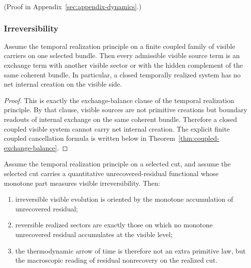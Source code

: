 (Proof in Appendix~\ref{sec:appendix-dynamics}.)

\subsubsection{Irreversibility}

\begin{theorem}
\label{thm:temporal-realization-forbids-primitive-internal-creation}
Assume the temporal realization principle on a finite coupled family of visible
carriers on one selected bundle. Then every admissible visible source term is
an exchange term with another visible sector or with the hidden complement of
the same coherent bundle. In particular, a closed temporally realized system
has no net internal creation on the visible side.
\end{theorem}

\begin{proof}
This is exactly the exchange-balance clause of the temporal realization
principle. By that clause, visible sources are not primitive creations but
boundary readouts of internal exchange on the same coherent bundle. Therefore a
closed coupled visible system cannot carry net internal creation. The explicit
finite coupled cancellation formula is written below in
Theorem~\ref{thm:coupled-exchange-balance}.
\end{proof}

\begin{theorem}
\label{thm:unrecovered-residual-orients-physical-time}
Assume the temporal realization principle on a selected cut, and assume the
selected cut carries a quantitative unrecovered-residual functional whose
monotone part measures visible irreversibility. Then:
\begin{enumerate}[label=(\roman*), leftmargin=2em, itemsep=0.2em]
\item irreversible visible evolution is oriented by the monotone accumulation
      of unrecovered residual;
\item reversible realized sectors are exactly those on which no monotone
      unrecovered residual accumulates at the visible level;
\item the thermodynamic arrow of time is therefore not an extra primitive law,
      but the macroscopic reading of residual nonrecovery on the realized cut.
\end{enumerate}
\end{theorem}

